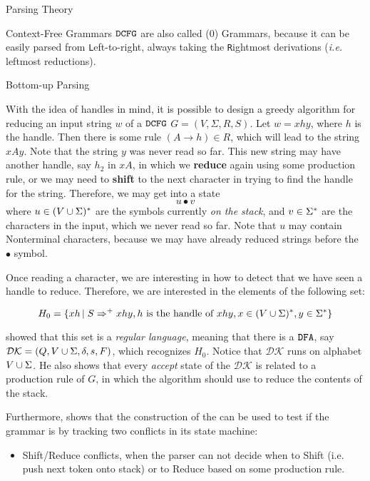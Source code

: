 \begin{section}{Parsing Theory}
\begin{subsection}{Context-Free Grammars}
$\texttt{DCFG}$ are also called (0) Grammars, because it can
be easily parsed from \texttt{L}eft-to-right, always taking the \texttt{R}ightmost
derivations (\textit{i.e.} leftmost reductions).

\end{subsection}
\begin{subsection}{Bottom-up Parsing}

With the idea of handles in mind, it is possible to design a greedy algorithm
for reducing an input string $w$ of a $\texttt{DCFG}$ $G = (V, \Sigma, R, S)$. Let $w = xhy$, where $h$ is the
handle. Then there is some rule $\left(A \rightarrow h \right) \in R$, which will lead to the
string $xAy$. Note that the string $y$ was never read so far. This new string
may have another handle, say $h_2$ in $xA$, in which we \textbf{reduce} again
using some production rule, or we may need to \textbf{shift} to the next character
in trying to find the handle for the string. Therefore, we may get into a state
$$u \bullet v$$
where $u \in (V \cup \Sigma)^*$ are the symbols currently \textit{on the stack},
and $v \in \Sigma^*$ are the characters in the input, which we never read so far.
Note that $u$ may contain Nonterminal characters, because we may have already
reduced strings before the $\bullet$ symbol.

Once reading a character, we are interesting in how to detect that we have
seen a handle to reduce. Therefore, we are interested in the elements of
the following set:

$$H_0 = \{xh\,|\;S \Rightarrow^+ xhy, h \text{ is the handle of } xhy, x \in (V \cup \Sigma)^*, y \in \Sigma^*\}$$

\cite{knuth1965translation} showed that this set is a \textit{regular language},
meaning that there is a $\texttt{DFA}$, say $\mathcal{DK} = (Q, V \cup \Sigma, \delta, s, F)$, which
recognizes $H_0$. Notice that $\mathcal{DK}$ runs on alphabet $V \cup \Sigma$.
He also shows that every \textit{accept} state of the $\mathcal{DK}$ is related
to a production rule of $G$, in which the algorithm should use to reduce the
contents of the stack.

Furthermore, \cite{sipser2012} shows that the construction of the
\DFA can be used to test if the grammar is \DCFG by tracking two
conflicts in its state machine:

\begin{itemize}
	\item Shift/Reduce conflicts, when the parser can not decide when
	to Shift (i.e. push next token onto stack) or to Reduce based on
	some production rule.


\end{itemize}
\end{subsection}
\end{section}
